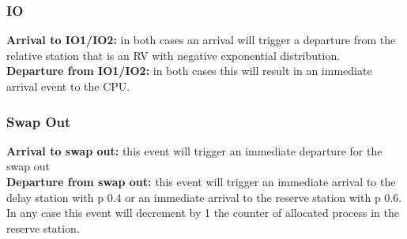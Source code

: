 \documentclass[12pt,a4paper]{article}
\begin{document}
\subsubsection{IO}

\textbf{Arrival to IO1/IO2:} in both cases an arrival will trigger a departure from the relative station that is an RV with negative exponential distribution.
\\
\textbf{Departure from IO1/IO2:} in both cases this will result in an immediate arrival event to the CPU.

\subsubsection{Swap Out}
\textbf{Arrival to swap out:} this event will trigger an immediate departure for the swap out
\\
\textbf{Departure from swap out:} this event will trigger an immediate arrival to the delay station with p 0.4 or an immediate arrival to the reserve station with p 0.6. In any case this event will decrement by 1 the counter of allocated process in the reserve station.
\end{document}
